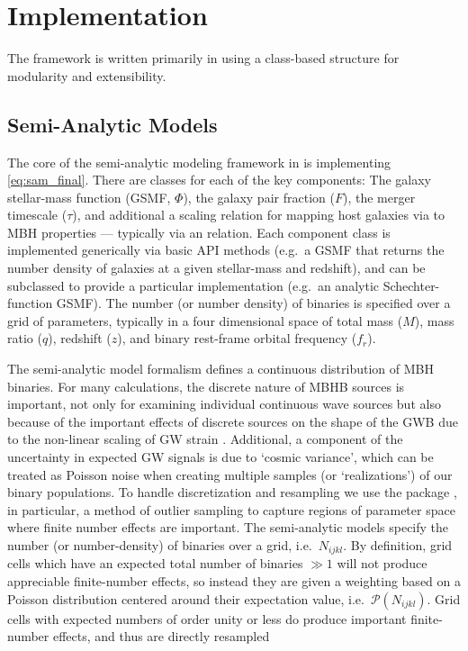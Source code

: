 \section{Implementation}
    \label{sec:imp}

    The \holodeck{} framework is written primarily in \python{} using a class-based structure for modularity and extensibility.

    \subsection{Semi-Analytic Models}
        \label{sec:imp_sam}

        The core of the semi-analytic modeling framework in \holodeck{} is implementing \eqref{eq:sam_final}.  There are classes for each of the key components: The galaxy stellar-mass function (GSMF, $\Phi$), the galaxy pair fraction ($F$), the merger timescale ($\tau$), and additional a scaling relation for mapping host galaxies via to MBH properties --- typically via an \mmbulge{} relation.  Each component class is implemented generically via basic API methods (e.g.~a GSMF that returns the number density of galaxies at a given stellar-mass and redshift), and can be subclassed to provide a particular implementation (e.g.~an analytic Schechter-function GSMF).  The number (or number density) of binaries is specified over a grid of parameters, typically in a four dimensional space of total mass ($M$), mass ratio ($q$), redshift ($z$), and binary rest-frame orbital frequency ($f_r$).

        The semi-analytic model formalism defines a continuous distribution of MBH binaries.  For many calculations, the discrete nature of MBHB sources is important, not only for examining individual continuous wave sources but also because of the important effects of discrete sources on the shape of the GWB due to the non-linear scaling of GW strain \citep{Sesana+2008}.  Additional, a component of the uncertainty in expected GW signals is due to `cosmic variance', which can be treated as Poisson noise when creating multiple samples (or `realizations') of our binary populations.  To handle discretization and resampling we use the \kalepy{} package \citep{kalepy2021}, in particular, a method of outlier sampling to capture regions of parameter space where finite number effects are important.  The \holodeck{} semi-analytic models specify the number (or number-density) of binaries over a grid, i.e.~$N_{ijkl}$.  By definition, grid cells which have an expected total number of binaries $\gg 1$ will not produce appreciable finite-number effects, so instead they are given a weighting based on a Poisson distribution centered around their expectation value, i.e.~$\mathcal{P}(N_{ijkl})$.  Grid cells with expected numbers of order unity or less do produce important finite-number effects, and thus are directly resampled

